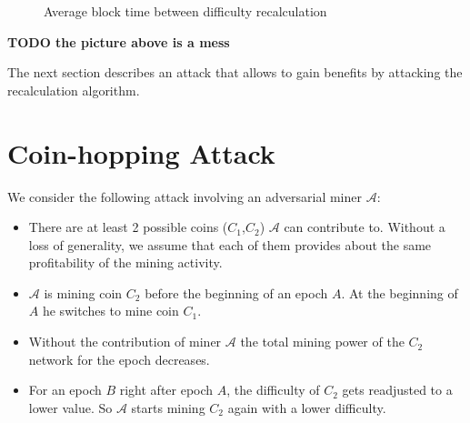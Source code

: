 \documentclass[]{llncs}
\newcommand{\AttackName}{Coin-hopping Attack}
\newcommand{\coinA}{$C_1$}
\newcommand{\coinB}{$C_2$}
\begin{document}
\begin{figure}[H]
\caption{Average block time between difficulty recalculation}
\label{fig:image}
\end{figure}

\textbf{TODO the picture above is a mess}

The next section describes an attack that allows to gain benefits by attacking the recalculation algorithm.
\section{\AttackName}
\label{sec:attack}

We consider the following attack involving an adversarial miner $\mathcal{A}$:

\begin{itemize}
\item There are at least 2 possible coins (\coinA{},\coinB{}) $\mathcal{A}$ can contribute to. Without a loss of generality, we assume that each of them provides about the same profitability of the mining activity.
\item $\mathcal{A}$ is mining coin \coinB{} before the beginning of an epoch $A$. At the beginning of $A$ he switches to mine coin \coinA{}.
\item Without the contribution of miner $\mathcal{A}$ the total mining power of the \coinB{} network for the epoch decreases.
\item For an epoch $B$ right after epoch $A$, the difficulty of \coinB{} gets readjusted to a lower value. So $\mathcal{A}$ starts mining \coinB{} again with a lower difficulty.
\end{itemize}
\end{document}
